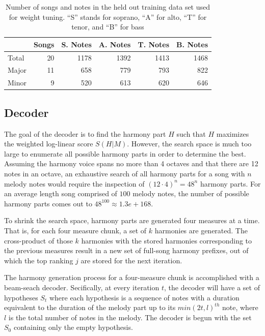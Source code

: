 \documentclass{sig-alternate}
\begin{document}
\begin{table}[h]
  \begin{center}
      \begin{tabular}{| l | r | r | r | r | r |}
      \hline
       \  & Songs & S. Notes & A. Notes & T. Notes & B. Notes \\ \hline
       Total &  20 & 1178 & 1392 & 1413 & 1468 \\ \hline
       Major &  11 & 658 & 779 & 793 & 822 \\ \hline
       Minor & 9 & 520 & 613 & 620 & 646  \\ \hline
      \end{tabular}
  \end{center}
  \caption{Number of songs and notes in the held out training data set used for weight tuning. ``S'' stands for soprano, ``A'' for alto, ``T'' for tenor, and ``B'' for bass}
\end{table}

\subsection {Decoder}
The goal of the decoder is to find the harmony part $H$ such that $H$ maximizes the weighted log-linear score $S(H | M)$. However, the search space is much too large to enumerate all possible harmony parts in order to determine the best. Assuming the harmony voice spans no more than 4 octaves and that there are 12 notes in an octave, an exhaustive search of all harmony parts for a song with $n$ melody notes would require the inspection of $(12\cdot 4)^{n} = 48^{n}$ harmony parts. For an average length song comprised of $100$ melody notes, the number of possible harmony parts comes out to $48^{100} \approx 1.3e+168$. 

To shrink the search space, harmony parts are generated four measures at a time. That is, for each four measure chunk, a set of $k$ harmonies are generated. The cross-product of those $k$ harmonies with the stored harmonies corresponding to the previous measures result in a new set of full-song harmony prefixes, out of which the top ranking $j$ are stored for the next iteration.

The harmony generation process for a four-measure chunk is accomplished with a beam-seach decoder. Secifically, at every iteration $t$, the decoder will have a set of hypotheses $S_{t}$ where each hypothesis is a sequence of notes with a duration equivalent to the duration of the melody part up to its $min(2t, l)^{th}$ note, where $l$ is the total number of notes in the melody. The decoder is begun with the set $S_{0}$ containing only the empty hypothesis. 
\end{document}
